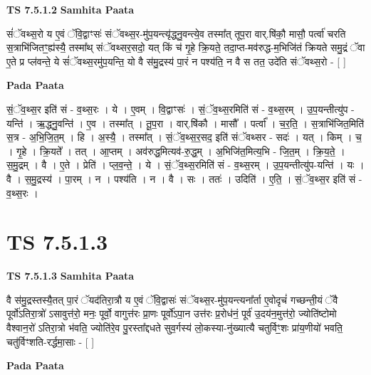 \documentclass[17pt]{extarticle}
\begin{document}
\textbf{TS 7.5.1.2 } \newline
\textbf{Samhita Paata} \newline

सं॑ॅवथ्स॒रो य ए॒वं ॅवि॒द्वाꣳसः॑ संॅवथ्स॒र-मु॑प॒यन्त्यृ॑द्ध्नु॒वन्त्ये॒व तस्मा᳚त् तूप॒रा वार्.षि॑कौ॒ मासौ॒ पर्त्वा॑ चरति स॒त्राभि॑जितꣳ॒॒ह्य॑स्यै॒ तस्मा᳚थ् संॅवथ्सर॒सदो॒ यत् किं च॑ गृ॒हे क्रि॒यते॒ तदा॒प्त-मव॑रुद्ध-म॒भिजि॑तं क्रियते समु॒द्रं ॅवा ए॒ते प्र प्ल॑वन्ते॒ ये सं॑ॅवथ्स॒रमु॑प॒यन्ति॒ यो वै स॑मु॒द्रस्य॑ पा॒रं न पश्य॑ति॒ न वै स तत॒ उदे॑ति संॅवथ्स॒रो - [  ] \newline

\textbf{Pada Paata} \newline

सं॒ॅव॒थ्स॒र इति॑ सं - व॒थ्स॒रः । ये । ए॒वम् । वि॒द्वाꣳसः॑ । सं॒ॅव॒थ्स॒रमिति॑ सं - व॒थ्स॒रम् । उ॒प॒यन्तीत्यु॑प - यन्ति॑ । ऋ॒द्ध्नु॒वन्ति॑ । ए॒व । तस्मा᳚त् । तू॒प॒रा । वार्.षि॑कौ । मासौ᳚ । पर्त्वा᳚ । च॒र॒ति॒ । स॒त्राभि॑जित॒मिति॑ स॒त्र - अ॒भि॒जि॒त॒म् । हि । अ॒स्यै॒ । तस्मा᳚त् । सं॒ॅव॒थ्स॒र॒सद॒ इति॑ संॅवथ्सर - सदः॑ । यत् । किम् । च॒ । गृ॒हे । क्रि॒यते᳚ । तत् । आ॒प्तम् । अव॑रुद्ध॒मित्यव॑-रु॒द्ध॒म् । अ॒भिजि॑त॒मित्य॒भि - जि॒त॒म् । क्रि॒य॒ते॒ । स॒मु॒द्रम् । वै । ए॒ते । प्रेति॑ । प्ल॒व॒न्ते॒ । ये । सं॒ॅव॒थ्स॒रमिति॑ सं - व॒थ्स॒रम् । उ॒प॒यन्तीत्यु॑प-यन्ति॑ । यः । वै । स॒मु॒द्रस्य॑ । पा॒रम् । न । पश्य॑ति । न । वै । सः । ततः॑ । उदिति॑ । ए॒ति॒ । सं॒ॅव॒थ्स॒र इति॑ सं - व॒थ्स॒रः ।  \newline




\section*{ TS 7.5.1.3 }

\textbf{TS 7.5.1.3 } \newline
\textbf{Samhita Paata} \newline

वै स॑मु॒द्रस्तस्यै॒तत् पा॒रं ॅयद॑तिरा॒त्रौ य ए॒वं ॅवि॒द्वासः॑ संॅवथ्स॒र-मु॑प॒यन्त्यना᳚र्ता ए॒वोदृचं॑ गच्छन्ती॒यं ॅवै पूर्वो॑ऽतिरा॒त्रो॑ ऽसावुत्त॑रो॒ मनः॒ पूर्वो॒ वागुत्त॑रः प्रा॒णः पूर्वो॑ऽपा॒न उत्त॑रः प्र॒रोध॑नं॒ पूर्व॑ उ॒दय॑न॒मुत्त॑रो॒ ज्योति॑ष्टोमो वैश्वान॒रो॑ ऽतिरा॒त्रो भ॑वति॒ ज्योति॑रे॒व पु॒रस्ता᳚द्दधते सुव॒र्गस्य॑ लो॒कस्या-नु॑ख्यात्यै चतुर्विꣳ॒॒शः प्रा॑य॒णीयो॑ भवति॒ चतु॑र्विꣳशति-रर्द्धमा॒साः - [  ] \newline

\textbf{Pada Paata} \newline
\end{document}
